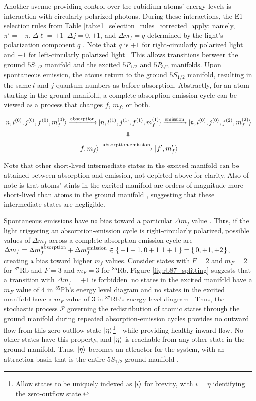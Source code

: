 \documentclass[11pt]{article}
\begin{document}
Another avenue providing control over the rubidium atoms' energy levels is
interaction with circularly polarized photons. During these
interactions, the E1 selection rules from Table
\ref{tab:e1_selection_rules_corrected} apply: namely, $\pi' = -\pi$,
$\Delta \ell = \pm 1$, $\Delta j = 0, \pm 1$, and $\Delta m_f = q$
determined by the light's polarization component $q$ \cite{qmech, harris}.
Note that $q$ is $+1$ for
right-circularly polarized light and $-1$ for left-circularly polarized light
\cite{qmech}. This allows transitions between the
ground $5S_{1/2}$ manifold and the excited $5P_{1/2}$ and $5P_{3/2}$
manifolds. Upon spontaneous emission, the atoms return to the ground
$5S_{1/2}$ manifold, resulting in the same $l$ and $j$ quantum
numbers as before absorption. Abstractly, for an atom starting in the
ground manifold,
a complete absorption-emission cycle can be viewed as a process that changes
$f$, $m_f$, or both.

\[
  \ket{n, l^{(0)}, j^{(0)}, f^{(0)}, m_f^{(0)}}
  \xrightarrow{\text{absorption}}
  \ket{n, l^{(1)}, j^{(1)}, f^{(1)}, m_f^{(1)}}
  \xrightarrow{\text{emission}}
  \ket{n, l^{(0)}, j^{(0)}, f^{(2)}, m_f^{(2)}}
\]
\[
  \Downarrow
\]
\[
  \ket{f, m_f} \xrightarrow{\text{absorption-emission}} \ket{f', m_f'}
\]

Note that other short-lived intermediate states in the excited
manifold can be attained between absorption and emission, not
depicted above for clarity. Also of note is that atoms' stints in the
excited manifold are orders of magnitude more short-lived than atoms
in the ground manifold \cite{harris}, suggesting that these
intermediate states are
negligible.

Spontaneous emissions have no bias toward a particular $\Delta
m_f$ value \cite{qmech, harris}. Thus, if the light triggering an
absorption-emission cycle is
right-circularly polarized, possible values of $\Delta m_f$ across a
complete absorption-emission cycle are $\Delta m_f = \Delta
m_f^\text{absorption} +
\Delta m_f^\text{emission} \in \set{-1 + 1, 0 + 1, 1 + 1} = \set{0,
+1, +2}$, creating a bias toward higher $m_f$ values. Consider states
with $F = 2$ and $m_F = 2$ for $^{87}$Rb and $F = 3$ and $m_F = 3$
for $^{85}$Rb. Figure \ref{fig:rb87_splitting} suggests that
a transition with $\Delta m_f = +1$ is forbidden; no states in the
excited manifold have a $m_F$ value of $4$ in $^{85}$Rb's energy level diagram
and no states in the excited manifold have a $m_F$ value of $3$ in
$^{87}$Rb's energy level diagram \cite{harris}. Thus, the stochastic
process $\mathcal P$ governing the redistribution of atomic states through the
ground manifold during repeated absorption-emission cycles provides no
outward flow from this zero-outflow state $\ket{\eta}$\footnote{Allow
  states to be uniquely indexed as $\ket{i}$ for
  brevity, with $i = \eta$ identifying the zero-outflow
state.}---while providing
healthy inward flow. No other states have this property, and $\ket{\eta}$
is reachable from any other state in the ground manifold. Thus,
$\ket{\eta}$ becomes an attractor for the system, with an
attraction basin that is the entire $5S_{1/2}$ ground manifold \cite{strog}.
\end{document}
